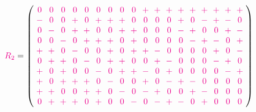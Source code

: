 \documentclass{beamer}
\newcommand{\MM}[1]{\textcolor{magenta}{#1}}
\begin{document}
\begin{frame}

  \[
    \MM{R_2} =
    \left(
      \arraycolsep=3.0pt\def\arraystretch{1.0}
      \begin{array}{cccccccccccccccccc}
        \MM{0}&\MM{0}&\MM{0}&\MM{0}&\MM{0}&\MM{0}&\MM{0}&\MM{0}&\MM{0}&\MM{+}&\MM{+}&\MM{+}&\MM{+}&\MM{+}&\MM{+}&\MM{+}&\MM{+}&\MM{+}\\
        \MM{-}&\MM{0}&\MM{0}&\MM{+}&\MM{0}&\MM{+}&\MM{+}&\MM{+}&\MM{0}&\MM{0}&\MM{0}&\MM{0}&\MM{+}&\MM{0}&\MM{-}&\MM{+}&\MM{-}&\MM{0}\\
        \MM{0}&\MM{-}&\MM{0}&\MM{+}&\MM{+}&\MM{0}&\MM{0}&\MM{+}&\MM{+}&\MM{0}&\MM{0}&\MM{0}&\MM{-}&\MM{+}&\MM{0}&\MM{0}&\MM{+}&\MM{-}\\
        \MM{0}&\MM{0}&\MM{-}&\MM{0}&\MM{+}&\MM{+}&\MM{+}&\MM{0}&\MM{+}&\MM{0}&\MM{0}&\MM{0}&\MM{0}&\MM{-}&\MM{+}&\MM{-}&\MM{0}&\MM{+}\\
        \MM{+}&\MM{+}&\MM{0}&\MM{-}&\MM{0}&\MM{0}&\MM{+}&\MM{0}&\MM{+}&\MM{+}&\MM{-}&\MM{0}&\MM{0}&\MM{0}&\MM{0}&\MM{+}&\MM{0}&\MM{-}\\
        \MM{0}&\MM{+}&\MM{+}&\MM{0}&\MM{-}&\MM{0}&\MM{+}&\MM{+}&\MM{0}&\MM{0}&\MM{+}&\MM{-}&\MM{0}&\MM{0}&\MM{0}&\MM{-}&\MM{+}&\MM{0}\\
        \MM{+}&\MM{0}&\MM{+}&\MM{0}&\MM{0}&\MM{-}&\MM{0}&\MM{+}&\MM{+}&\MM{-}&\MM{0}&\MM{+}&\MM{0}&\MM{0}&\MM{0}&\MM{0}&\MM{-}&\MM{+}\\
        \MM{+}&\MM{0}&\MM{+}&\MM{+}&\MM{+}&\MM{0}&\MM{-}&\MM{0}&\MM{0}&\MM{+}&\MM{0}&\MM{-}&\MM{+}&\MM{-}&\MM{0}&\MM{0}&\MM{0}&\MM{0}\\
        \MM{+}&\MM{+}&\MM{0}&\MM{0}&\MM{+}&\MM{+}&\MM{0}&\MM{-}&\MM{0}&\MM{-}&\MM{+}&\MM{0}&\MM{0}&\MM{+}&\MM{-}&\MM{0}&\MM{0}&\MM{0}\\
        \MM{0}&\MM{+}&\MM{+}&\MM{+}&\MM{0}&\MM{+}&\MM{0}&\MM{0}&\MM{-}&\MM{0}&\MM{-}&\MM{+}&\MM{-}&\MM{0}&\MM{+}&\MM{0}&\MM{0}&\MM{0}\\
      \end{array}
    \right)
  \]

\end{frame}
\end{document}
